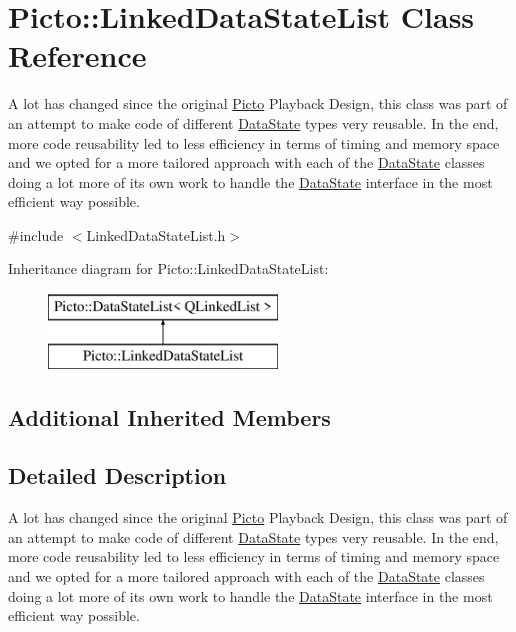 \hypertarget{class_picto_1_1_linked_data_state_list}{\section{Picto\-:\-:Linked\-Data\-State\-List Class Reference}
\label{class_picto_1_1_linked_data_state_list}
}


A lot has changed since the original \hyperlink{namespace_picto}{Picto} Playback Design, this class was part of an attempt to make code of different \hyperlink{class_picto_1_1_data_state}{Data\-State} types very reusable. In the end, more code reusability led to less efficiency in terms of timing and memory space and we opted for a more tailored approach with each of the \hyperlink{class_picto_1_1_data_state}{Data\-State} classes doing a lot more of its own work to handle the \hyperlink{class_picto_1_1_data_state}{Data\-State} interface in the most efficient way possible.  




{\ttfamily \#include $<$Linked\-Data\-State\-List.\-h$>$}

Inheritance diagram for Picto\-:\-:Linked\-Data\-State\-List\-:\begin{figure}[H]
\begin{center}
\leavevmode
\includegraphics[height=2.000000cm]{class_picto_1_1_linked_data_state_list}
\end{center}
\end{figure}
\subsection*{Additional Inherited Members}


\subsection{Detailed Description}
A lot has changed since the original \hyperlink{namespace_picto}{Picto} Playback Design, this class was part of an attempt to make code of different \hyperlink{class_picto_1_1_data_state}{Data\-State} types very reusable. In the end, more code reusability led to less efficiency in terms of timing and memory space and we opted for a more tailored approach with each of the \hyperlink{class_picto_1_1_data_state}{Data\-State} classes doing a lot more of its own work to handle the \hyperlink{class_picto_1_1_data_state}{Data\-State} interface in the most efficient way possible. 

